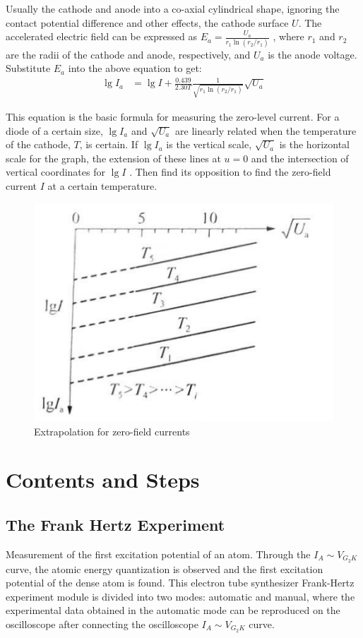 \documentclass[UTF8]{article}
\begin{document}
   Usually the cathode and anode into a co-axial cylindrical shape, ignoring the contact potential
   difference and other effects, the cathode surface $U$. The accelerated electric field can be
   expressed as $E_{a}=\frac{U_{a}}{r_{1} \ln \left(r_{2} / r_{1}\right)}$   , where $r_1$ and $r_2$ are the radii of the cathode and anode, respectively, and $U_a$ is the anode voltage. Substitute $E_a$ into the above equation to get:
   \begin{eqnarray}
   \lg I_{a} & =\lg I+\frac{0.439}{2.30 T} \frac{1}{\sqrt{r_{1} \ln \left(r_{2} / r_{1}\right)}} \sqrt{U_{a}}
   \end{eqnarray}
   
   This equation is the basic formula for measuring the zero-level current. For a diode of a certain size, $\lg I_{a}$ and $\sqrt{U_a} $ are linearly related when the temperature of the cathode, $T$, is certain. If $\lg I_{a}$   is the vertical scale, $\sqrt{U_a} $ is the horizontal scale for the graph, the extension of these lines at $u = 0$ and the intersection of vertical coordinates for $\lg I$ . Then find its opposition to find the zero-field current $I$ at a certain temperature. 
         	\begin{figure}[H]
                 	\centering
                 	\includegraphics[clip,scale=1,trim={0 0 0 0}]{fig/fig8.png}
                     \caption{Extrapolation for zero-field currents}
                     \label{figure.8}
            \end{figure} 
   
   
	\section{Contents and Steps}
	\subsection{The Frank Hertz Experiment}
	Measurement of the first excitation potential of an atom. Through the $I_A\sim V_{G_2K}$ curve, the atomic energy quantization is observed and the first excitation potential of the dense atom is found. This electron tube synthesizer Frank-Hertz experiment module is divided into two modes: automatic and manual, where the experimental data obtained in the automatic mode can be reproduced on the oscilloscope after connecting the oscilloscope $I_A\sim V_{G_2K}$ curve.
	
\end{document}
